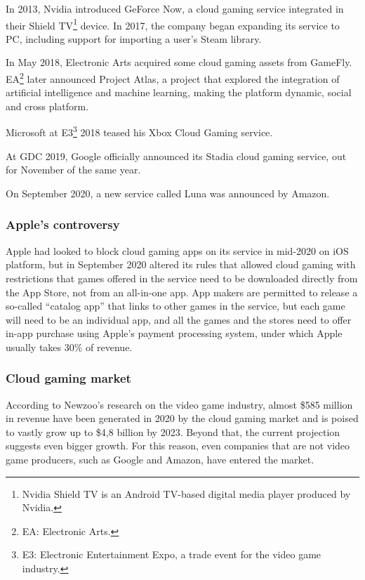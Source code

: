 In 2013, Nvidia introduced GeForce Now, a cloud gaming service integrated in their Shield TV\footnote{Nvidia Shield TV is an Android TV-based digital media player produced by Nvidia.} device. In 2017, the company began expanding its service to PC, including support for importing a user's Steam library.

In May 2018, Electronic Arts acquired some cloud gaming assets from GameFly. EA\footnote{EA: Electronic Arts.} later announced Project Atlas, a project that explored the integration of artificial intelligence and machine learning, making the platform dynamic, social and cross platform.

Microsoft at E3\footnote{E3: Electronic Entertainment Expo, a trade event for the video game industry.} 2018 teased his Xbox Cloud Gaming service.

At GDC 2019, Google officially announced its Stadia cloud gaming service, out for November of the same year.

On September 2020, a new service called Luna was announced by Amazon\cite{Cloud_gaming_history}.

\subsubsection{Apple's controversy}
Apple had looked to block cloud gaming apps on its service in mid-2020 on iOS platform, but in September 2020 altered its rules that allowed cloud gaming with restrictions that games offered in the service need to be downloaded directly from the App Store, not from an all-in-one app. App makers are permitted to release a so-called “catalog app” that links to other games in the service, but each game will need to be an individual app, and all the games and the stores need to offer in-app purchase using Apple’s payment processing system, under which Apple usually takes 30\% of revenue\cite{Apple_controversy}.

\subsubsection{Cloud gaming market}
According to Newzoo's research on the video game industry, almost \$585 million in revenue have been generated in 2020 by the cloud gaming market and is poised to vastly grow up to \$4,8 billion by 2023. Beyond that, the current projection suggests even bigger growth. For this reason, even companies that are not video game producers, such as Google and Amazon, have entered the market. 

